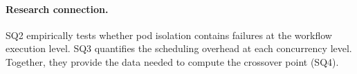 \paragraph{Research connection.}
SQ2 empirically tests whether pod isolation contains failures at the workflow execution level. SQ3 quantifies the scheduling overhead at each concurrency level. Together, they provide the data needed to compute the crossover point (SQ4).
